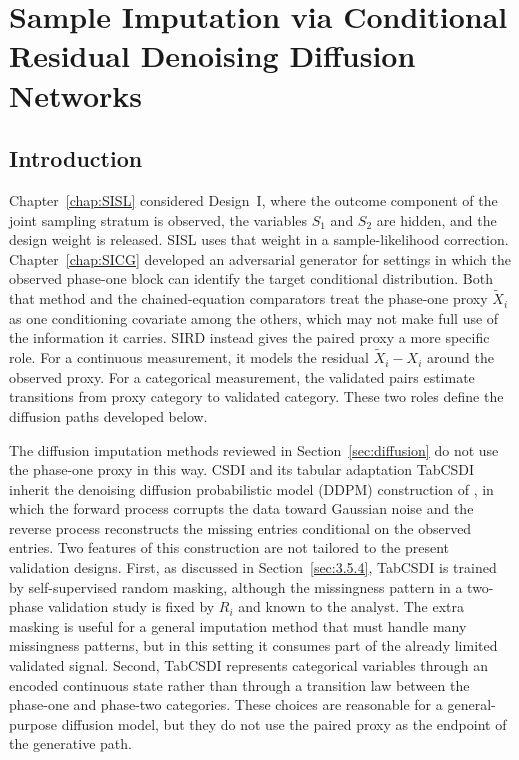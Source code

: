 \chapter{Sample Imputation via Conditional Residual Denoising Diffusion Networks}
\label{chap:SIRD}

\section{Introduction}
\label{sec:sird_intro}

Chapter~\ref{chap:SISL} considered Design~I, where the outcome component of the joint sampling stratum is observed, the variables $S_1$ and $S_2$ are hidden, and the design weight is released. SISL uses that weight in a sample-likelihood correction. Chapter~\ref{chap:SICG} developed an adversarial generator for settings in which the observed phase-one block can identify the target conditional distribution. Both that method and the chained-equation comparators treat the phase-one proxy $\tilde X_i$ as one conditioning covariate among the others, which may not make full use of the information it carries. SIRD instead gives the paired proxy a more specific role. For a continuous measurement, it models the residual $\tilde X_i-X_i$ around the observed proxy. For a categorical measurement, the validated pairs estimate transitions from proxy category to validated category. These two roles define the diffusion paths developed below.

The diffusion imputation methods reviewed in Section~\ref{sec:diffusion} do not use the phase-one proxy in this way. CSDI \citep{tashiro2021csdi} and its tabular adaptation TabCSDI \citep{zheng2022diffusion} inherit the denoising diffusion probabilistic model (DDPM) construction of \citet{ho2020denoising}, in which the forward process corrupts the data toward Gaussian noise and the reverse process reconstructs the missing entries conditional on the observed entries. Two features of this construction are not tailored to the present validation designs. First, as discussed in Section~\ref{sec:3.5.4}, TabCSDI is trained by self-supervised random masking, although the missingness pattern in a two-phase validation study is fixed by \(R_i\) and known to the analyst. The extra masking is useful for a general imputation method that must handle many missingness patterns, but in this setting it consumes part of the already limited validated signal. Second, TabCSDI represents categorical variables through an encoded continuous state rather than through a transition law between the phase-one and phase-two categories. These choices are reasonable for a general-purpose diffusion model, but they do not use the paired proxy as the endpoint of the generative path.

